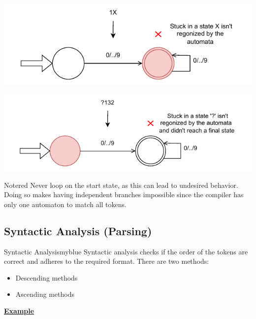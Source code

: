 \vspace{0.85cm}

 \hspace{5.65cm}   \includegraphics{Chapters/Examples/Intro/ex4.3.drawio.pdf}

\vspace{0.85cm}
  \hspace{5.65cm}  \includegraphics{Chapters/Examples/Intro/ex4.4.drawio.pdf}


\vspace{0.85cm}


\begin{prettyBox}{Note}{red}
Never loop on the start state, as this can lead to undesired behavior.  
Doing so makes having independent branches impossible since  
the compiler has only one automaton to match all tokens.
\end{prettyBox}

\subsection{Syntactic Analysis (Parsing)}
\begin{prettyBox}{Syntactic Analysis}{myblue}
Syntactic analysis checks if the order of the tokens are correct and adheres to the required format. There are two methods:  
\begin{itemize}
    \item Descending methods  
    \item Ascending methods  
\end{itemize}
\end{prettyBox}

\vspace{0.95cm}
\underline{\textbf{Example}}

